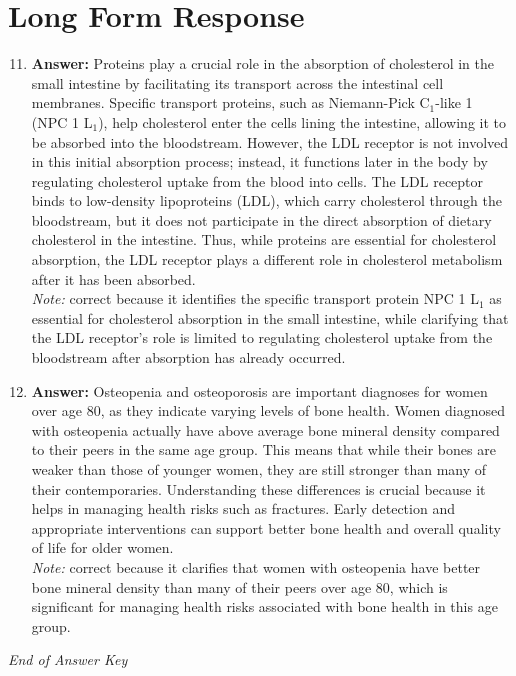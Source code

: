 \documentclass[12pt]{article}
\begin{document}
\section*{Long Form Response}
\begin{enumerate}[label=\arabic*.]
\setcounter{enumi}{10}
\item \textbf{Answer:} Proteins play a crucial role in the absorption of cholesterol in the small intestine by facilitating its transport across the intestinal cell membranes. Specific transport proteins, such as Niemann-Pick C$_{1}$-like 1 (NPC 1 L$_{1}$), help cholesterol enter the cells lining the intestine, allowing it to be absorbed into the bloodstream. However, the LDL receptor is not involved in this initial absorption process; instead, it functions later in the body by regulating cholesterol uptake from the blood into cells. The LDL receptor binds to low-density lipoproteins (LDL), which carry cholesterol through the bloodstream, but it does not participate in the direct absorption of dietary cholesterol in the intestine. Thus, while proteins are essential for cholesterol absorption, the LDL receptor plays a different role in cholesterol metabolism after it has been absorbed.
\\ \textit{Note:} correct because it identifies the specific transport protein NPC 1 L$_{1}$ as essential for cholesterol absorption in the small intestine, while clarifying that the LDL receptor's role is limited to regulating cholesterol uptake from the bloodstream after absorption has already occurred.
\item \textbf{Answer:} Osteopenia and osteoporosis are important diagnoses for women over age 80, as they indicate varying levels of bone health. Women diagnosed with osteopenia actually have above average bone mineral density compared to their peers in the same age group. This means that while their bones are weaker than those of younger women, they are still stronger than many of their contemporaries. Understanding these differences is crucial because it helps in managing health risks such as fractures. Early detection and appropriate interventions can support better bone health and overall quality of life for older women.
\\ \textit{Note:} correct because it clarifies that women with osteopenia have better bone mineral density than many of their peers over age 80, which is significant for managing health risks associated with bone health in this age group.
\end{enumerate}

\vfill
\noindent\textit{End of Answer Key}
\end{document}
